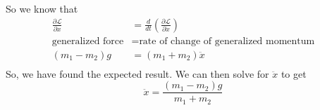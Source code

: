 \documentclass[11pt, leqno]{article}
\begin{document}
So we know that 
\begin{align*}
\frac{\partial \mathcal{L}}{\partial x} &= \frac{d}{dt}\left( \frac{\partial \mathcal{L}}{\partial \dot{x}} \right) \\ 
\text{generalized force} &= \text{rate of change of generalized momentum} \\
(m_1 - m_2)g  &= (m_1 + m_2)\ddot{x} \\ 
\end{align*}
So, we have found the expected result. We can then solve for $\ddot{x}$ to get 
$$ 
\boxed{\ddot{x} = \frac{(m_1 - m_2)g }{m_1 + m_2}}
$$
\end{document}
